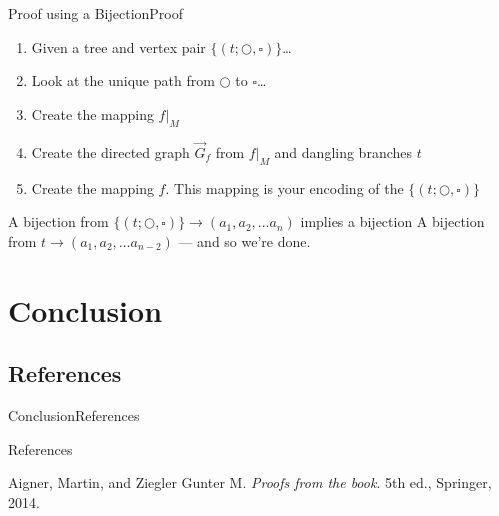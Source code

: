 \documentclass[10pt]{beamer}
\theoremstyle{definition}
\newcommand{\Sthree}{Proof using a Bijection}
\newcommand{\SthreeSSproof}{Proof}
\newcommand{\Sfour}{Conclusion}
\newcommand{\SfourSSreference}{References}
\begin{document}
\begin{frame}{\Sthree}{\SthreeSSproof}
\begin{enumerate}
  \item Given a tree and vertex pair $\{(t; \bigcirc, \square)\}$\ldots
  \pause{}
  \item Look at the unique path from $\bigcirc$ to $\square$\ldots
  \pause{}
  \item Create the mapping $f|_{M}$
  \pause{}
  \item Create the directed graph $\vec G_{f}$ from $f|_{M}$ and dangling branches $t$
  \pause{}
  \item Create the mapping $f$. This mapping is your encoding of the $\{(t; \bigcirc, \square)\}$
\end{enumerate}

\pause{}

A bijection from $\{(t; \bigcirc, \square)\} \rightarrow (a_{1},a_{2},\ldots a_{n})$ implies a bijection A bijection from $t \rightarrow (a_{1},a_{2},\ldots a_{n-2})$ --- and so we're done.

\end{frame}

\section{\Sfour}
\subsection{\SfourSSreference}
\begin{frame}{\Sfour}{\SfourSSreference}
\begin{block}{\SfourSSreference}
\begin{thebibliography}{9}
Aigner, Martin, and Ziegler Gunter M.
\textit{Proofs from the book}.
5th ed., Springer, 2014.
\end{thebibliography}
\end{block}

\end{frame}

\end{document}
